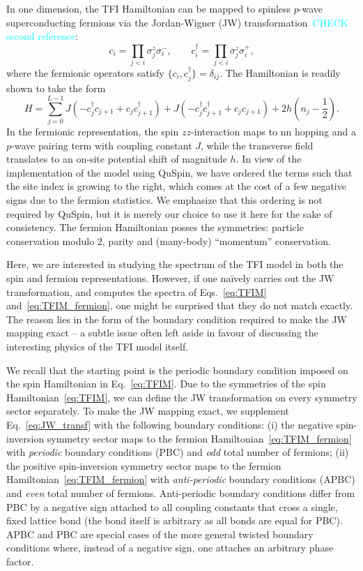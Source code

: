 \documentclass{SciPost}
\newcommand\0{\scalebox{-1}[1]{0}}
\newcommand*{\cyan}{\textcolor{cyan}}
\begin{document}
In one dimension, the TFI Hamiltonian can be mapped to spinless $p$-wave superconducting fermions via the Jordan-Wigner (JW) transformation~\cite{sachdev_book,dziarmaga_10}\cyan{CHECK second reference}:
\begin{equation}
c_i=\prod_{j<i}\sigma^z_j\sigma^-_i,\qquad c^\dagger_i=\prod_{j<i}\sigma^z_j\sigma^+_i,
\label{eq:JW_transf}
\end{equation} 
where the fermionic operators satisfy $\{c_i,c^\dagger_j\}=\delta_{ij}$. The Hamiltonian is readily shown to take the form
\begin{equation}
H=\sum_{j=0}^{L-1}J\left(-c^\dagger_jc_{j+1} + c_jc^\dagger_{j+1} \right) +J\left( -c^\dagger_jc^\dagger_{j+1} + c_jc_{j+1}\right) + 2h\left(n_j-\frac{1}{2}\right).
\label{eq:TFIM_fermion}
\end{equation}
In the fermionic representation, the spin $zz$-interaction maps to nn hopping and a $p$-wave pairing term with coupling constant $J$, while the transverse field translates to an on-site potential shift of magnitude $h$. In view of the implementation of the model using QuSpin, we have ordered the terms such that the site index is growing to the right, which comes at the cost of a few negative signs due to the fermion statistics. We emphasize that this ordering is not required by QuSpin, but it is merely our choice to use it here for the sake of consistency. The fermion Hamiltonian posses the symmetries: particle conservation modulo $2$, parity and (many-body) ``momentum'' conservation.

Here, we are interested in studying the spectrum of the TFI model in both the spin and fermion representations. However, if one na\"ively carries out the JW transformation, and computes the spectra of Eqs.~\eqref{eq:TFIM} and~\eqref{eq:TFIM_fermion}, one might be surprised that they do not match exactly. The reason lies in the form of the boundary condition required to make the JW mapping exact -- a subtle issue often left aside in favour of discussing the interesting physics of the TFI model itself. 

We recall that the starting point is the periodic boundary condition imposed on the spin Hamiltonian in Eq.~\eqref{eq:TFIM}. Due to the symmetries of the spin Hamiltonian~\eqref{eq:TFIM}, we can define the JW transformation on every symmetry sector separately. To make the JW mapping exact, we supplement Eq.~\eqref{eq:JW_transf} with the following boundary conditions: (i) the negative spin-inversion symmetry sector maps to the fermion Hamiltonian~\eqref{eq:TFIM_fermion} with \emph{periodic} boundary conditions (PBC) and \emph{odd} total number of fermions; (ii) the positive spin-inversion symmetry sector maps to the fermion Hamiltonian~\eqref{eq:TFIM_fermion} with \emph{anti-periodic} boundary conditions (APBC) and \emph{even} total number of fermions. Anti-periodic boundary conditions differ from PBC by a negative sign attached to all coupling constants that cross a single, fixed lattice bond (the bond itself is arbitrary as all bonds are equal for PBC). APBC and PBC are special cases of the more general twisted boundary conditions where, instead of a negative sign, one attaches an arbitrary phase factor.
\end{document}
